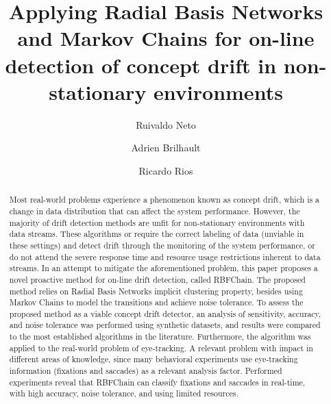 \documentclass[preprint,12pt]{elsarticle}
\begin{document}
\begin{frontmatter}


\title{Applying Radial Basis Networks and Markov Chains for on-line detection of concept drift in non-stationary environments}




\author{Ruivaldo Neto}
\author{Adrien Brilhault}
\author{Ricardo Rios}

\address{Salvador, Brazil}

\begin{abstract}
Most real-world problems experience a phenomenon known as concept drift,
which is a change in data distribution that can affect the system performance.
%
However, the majority of drift detection methods are unfit for non-stationary environments with data streams.
These algorithms or require the correct labeling of data (unviable in these settings) and detect drift through the monitoring of the system performance,
or do not attend the severe response time and resource usage restrictions inherent to data streams.
%
In an attempt to mitigate the aforementioned problem,
this paper proposes a novel proactive method for on-line drift detection,
called RBFChain.
The proposed method relies on Radial Basis Networks implicit clustering property,
besides using Markov Chains to model the transitions and achieve noise tolerance.
%
To assess the proposed method as a viable concept drift detector,
an analysis of sensitivity, accuracy,
and noise tolerance was performed using synthetic datasets,
and results were compared to the most established algorithms in the literature.
%
Furthermore, the algorithm was applied to the real-world problem of eye-tracking.
A relevant problem with impact in different areas of knowledge, since many behavioral experiments use eye-tracking information (fixations and saccades) as a relevant analysis factor.
Performed experiments reveal that RBFChain can classify fixations and saccades in real-time, with high accuracy, noise tolerance, and using limited resources.
\end{abstract}


\end{frontmatter}
\end{document}
